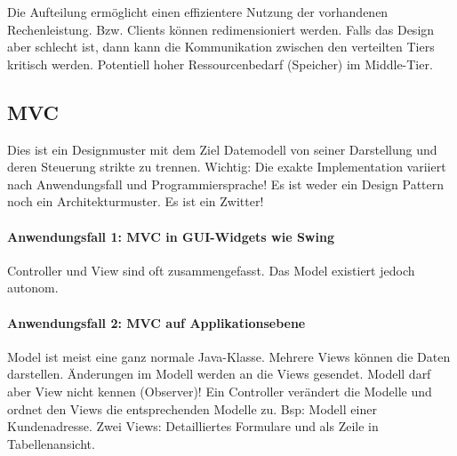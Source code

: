 Die Aufteilung ermöglicht einen effizientere Nutzung der vorhandenen Rechenleistung. Bzw. Clients können redimensioniert werden. Falls das Design aber schlecht ist, dann kann die Kommunikation zwischen den verteilten Tiers kritisch werden. Potentiell hoher Ressourcenbedarf (Speicher) im Middle-Tier.

\subsection{MVC}
Dies ist ein Designmuster mit dem Ziel Datemodell von seiner Darstellung und deren Steuerung strikte zu trennen. Wichtig: Die exakte Implementation variiert nach Anwendungsfall und Programmiersprache! Es ist weder ein Design Pattern noch ein Architekturmuster. Es ist ein Zwitter!

\paragraph{Anwendungsfall 1: MVC in GUI-Widgets wie Swing} Controller und View sind oft zusammengefasst. Das Model existiert jedoch autonom.

\paragraph{Anwendungsfall 2: MVC auf Applikationsebene} Model ist meist eine ganz normale Java-Klasse. Mehrere Views können die Daten darstellen. Änderungen im Modell werden an die Views gesendet. Modell darf aber View nicht kennen (Observer)! Ein Controller verändert die Modelle und ordnet den Views die entsprechenden Modelle zu. Bsp: Modell einer Kundenadresse. Zwei Views: Detailliertes Formulare und als Zeile in Tabellenansicht.

